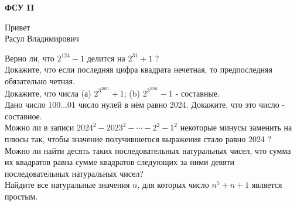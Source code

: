 \centerline{\bf \Huge ФСУ II}

\begin{flushright}
        \scriptsize{Привет\\Расул Владимирович}
\end{flushright}

Верно ли, что $2^{124}-1$ делится на $2^{31}+1$ ?\\

Докажите, что если последняя цифра квадрата нечетная, то предпоследняя обязательно четная.\\

Докажите, что числа (а) $2^{3^{2001}}+1$; (b) $2^{3^{2001}}-1$ - составные.\\

Дано число $100 \ldots 01$ число нулей в нём равно 2024. Докажите, что это число - составное.\\

Можно ли в записи $2024^2-2023^2-\cdots-2^2-1^2$ некоторые минусы заменить на плюсы так, чтобы значение получившегося выражения стало равно 2024 ?\\

Можно ли найти десять таких последовательных натуральных чисел, что сумма их квадратов равна сумме квадратов следующих за ними девяти последовательных натуральных чисел?\\

Найдите все натуральные значения $n$, для которых число $n^5+n+1$ является простым.\\

